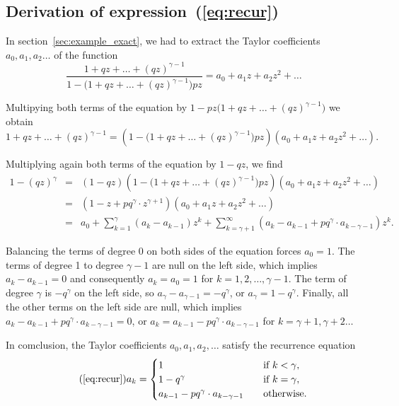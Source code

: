 \documentclass{article}
\begin{document}
\subsection{Derivation of expression~(\ref{eq:recur})}
\label{app_rec}

In section~\ref{sec:example_exact}, we had to extract the Taylor
coefficients $a_0, a_1, a_2 \ldots$ of the function
\begin{equation*}
\frac{1+qz+\ldots+(qz)^{\gamma-1}}
  {1-\big(1+qz+\ldots+(qz)^{\gamma-1} \big) pz} =
  a_0 + a_1z +a_2z^2 + \ldots
\end{equation*}

Multipying both terms of the equation by $1-pz
\big(1+qz+\ldots+(qz)^{\gamma-1} \big)$ we obtain
\begin{equation*}
1+qz+\ldots+(qz)^{\gamma-1} =
\left(1-\big(1+qz+\ldots+(qz)^{\gamma-1} \big) pz\right)
(a_0 + a_1z +a_2z^2 + \ldots).
\end{equation*}

Multiplying again both terms of the equation by $1-qz$, we find
\begin{eqnarray*}
1-(qz)^\gamma &=& (1-qz) \left(1- \big(1+qz+\ldots+(qz)^{\gamma-1}
\big) pz\right) (a_0 + a_1z +a_2z^2 + \ldots) \\
&=& (1-z+pq^\gamma \cdot z^{\gamma+1}) (a_0 + a_1z +a_2z^2 + \ldots) \\
&=& a_0 + \sum_{k=1}^{\gamma} (a_k-a_{k-1})z^k +
  \sum_{k=\gamma+1}^{\infty} (a_k-a_{k-1}+ pq^\gamma \cdot
a_{k-\gamma-1})z^k.
\end{eqnarray*}

Balancing the terms of degree 0 on both sides of the equation forces $a_0
= 1$. The terms of degree 1 to degree $\gamma-1$ are null on the left
side, which implies $a_k - a_{k-1} = 0$ and consequently $a_k = a_0 = 1$
for $k = 1, 2, \ldots, \gamma-1$. The term of degree $\gamma$ is
$-q^\gamma$ on the left side, so $a_\gamma-a_{\gamma-1} = -q^\gamma$, or
$a_\gamma = 1-q^\gamma$. Finally, all the other terms on the left side
are null, which implies $a_k-a_{k-1}+ pq^\gamma \cdot a_{k-\gamma-1} = 0$,
or $a_k = a_{k-1}-pq^\gamma\cdot a_{k-\gamma-1}$ for $k = \gamma+1,
\gamma+2 \ldots$

In comclusion, the Taylor coefficients $a_0, a_1, a_2, \ldots$ satisfy the
recurrence equation
\begin{equation}
\tag{\ref{eq:recur}}
a_k = 
\begin{cases}
1            &\quad\text{if } k < \gamma, \\
1 -q^\gamma &\quad\text{if } k = \gamma, \\
a_{k-1} -pq^\gamma \cdot a_{k-\gamma-1} &\quad\text{otherwise.}
\end{cases}
\end{equation}
\end{document}
